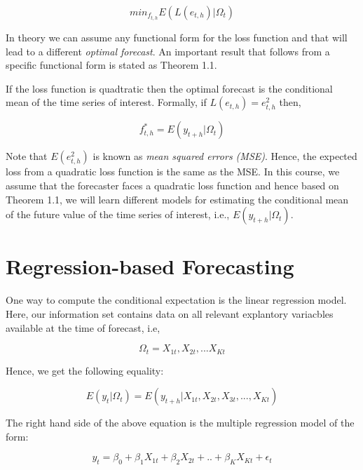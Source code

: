 \documentclass[]{book}
\theoremstyle{definition}
\theoremstyle{definition}
\theoremstyle{definition}
\theoremstyle{remark}
\let\BeginKnitrBlock\begin \let\EndKnitrBlock\end
\begin{document}
\begin{equation}
min_{f_{t,h}} E(L(e_{t,h})|\Omega_t)
\end{equation}

In theory we can assume any functional form for the loss function and
that will lead to a different \emph{optimal forecast}. An important
result that follows from a specific functional form is stated as Theorem
1.1.

\BeginKnitrBlock{theorem}
\protect\hypertarget{thm:unnamed-chunk-2}{}{\label{thm:unnamed-chunk-2} }If
the loss function is quadtratic then the optimal forecast is the
conditional mean of the time series of interest. Formally, if
\(L(e_{t,h})=e_{t,h}^2\) then,

\begin{equation}
f^*_{t,h}=E(y_{t+h}|\Omega_t)
\end{equation}
\EndKnitrBlock{theorem}

Note that \(E(e_{t,h}^2)\) is known as \emph{mean squared errors (MSE)}.
Hence, the expected loss from a quadratic loss function is the same as
the MSE. In this course, we assume that the forecaster faces a quadratic
loss function and hence based on Theorem 1.1, we will learn different
models for estimating the conditional mean of the future value of the
time series of interest, i.e., \(E(y_{t+h}|\Omega_t)\).

\chapter{Regression-based
Forecasting}\label{regression-based-forecasting}

One way to compute the conditional expectation is the linear regression
model. Here, our information set contains data on all relevant
explantory variacbles available at the time of forecast, i.e,

\begin{equation}
\Omega_t={X_{1t}, X_{2t},...X_{Kt}}
\end{equation}

Hence, we get the following equality:

\begin{equation}
E(y_t|\Omega_t)=E(y_{t+h}|X_{1t}, X_{2t}, X_{3t},...,X_{Kt})
\end{equation}

The right hand side of the above equation is the multiple regression
model of the form:

\begin{equation}
 y_{t}=\beta_0+\beta_1 X_{1t}+\beta_2 X_{2t}+..+\beta_K X_{Kt}+\epsilon_t
 \end{equation}
\end{document}

